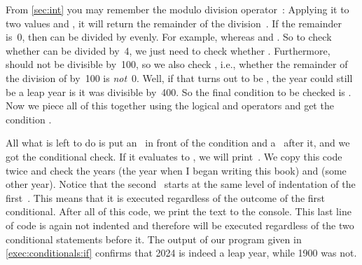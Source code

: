 \begin{sloppypar}%
From \cref{sec:int} you may remember the modulo division operator~\pythonilIdx{\%}:
Applying it to two values  and , it will return the remainder of the division~\pythonIdx{//}.
If the remainder is~0, then  can be divided by  evenly.
For example,  whereas  and .
So to check whether  can be divided by~4, we just need to check whether .
Furthermore,  should not be divisible by~100, so we also check , i.e., whether the remainder of the division of  by~100 is \emph{not}~0.
Well, if that turns out to be , the year could still be a leap year is it was divisible by~400.
So the final condition to be checked is .
Now we piece all of this together using the logical  and  operators and get the condition .
\end{sloppypar}%
%
All what is left to do is put an~ in front of the condition and a~\pythonilIdx{:} after it, and we got the conditional check.
If it evaluates to , we will print~.
We copy this code twice and check the years  (the year when I began writing this book) and  (some other year).
Notice that the second~ starts at the same level of indentation of the first~.
This means that it is executed regardless of the outcome of the first conditional.
After all of this code, we print the text  to the console.
This last line of code is again not indented and therefore will be executed regardless of the two conditional statements before it.
The output of our program given in \cref{exec:conditionals:if} confirms that 2024 is indeed a leap year, while 1900 was not.%
%
\FloatBarrier%
\endhsection%
%
%
%
%
%
%
%
%
